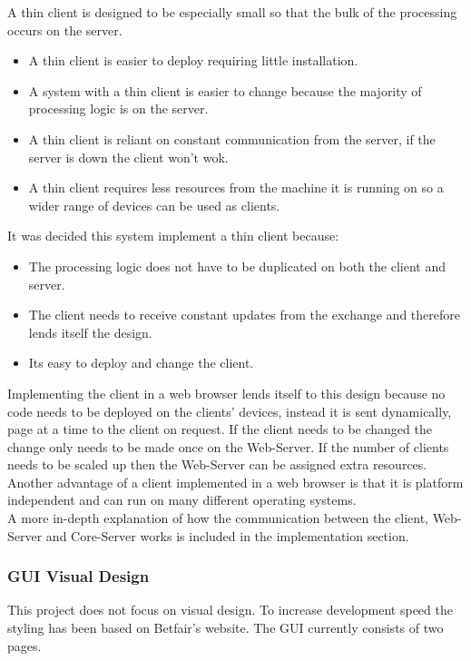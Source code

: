 		A thin client is designed to be especially small so that the bulk of the processing occurs on the server. 
		
		\begin{itemize}
			\item A thin client is easier to deploy requiring little installation.
			\item A system with a thin client is easier to change because the majority of processing logic is on the server.
			\item A thin client is reliant on constant communication from the server, if the server is down the client won't wok.
			\item A thin client requires less resources from the machine it is running on so a wider range of devices can be used as clients.
		\end{itemize}

It was decided this system implement a thin client because:

	\begin{itemize}
		\item The processing logic does not have to be duplicated on both the client and server.
		\item The client needs to receive constant updates from the exchange and therefore lends itself the design.
		\item Its easy to deploy and change the client.
	\end{itemize}		
		
	Implementing the client in a web browser lends itself to this design because no code needs to be deployed on the clients' devices, instead it is sent dynamically, page at a time to the client on request. If the client needs to be changed the change only needs to be made once on the Web-Server. If the number of clients needs to be scaled up then the Web-Server can be assigned extra resources. Another advantage of a client implemented in a web browser is that it is platform independent and can run on many different operating systems.\\
	
	A more in-depth explanation of how the communication between the client, Web-Server and Core-Server works is included in the implementation section.
	
	\subsubsection{GUI Visual Design}
	This project does not focus on visual design. To increase development speed the styling has been based on Betfair's website. The GUI currently consists of two pages.\\
	

